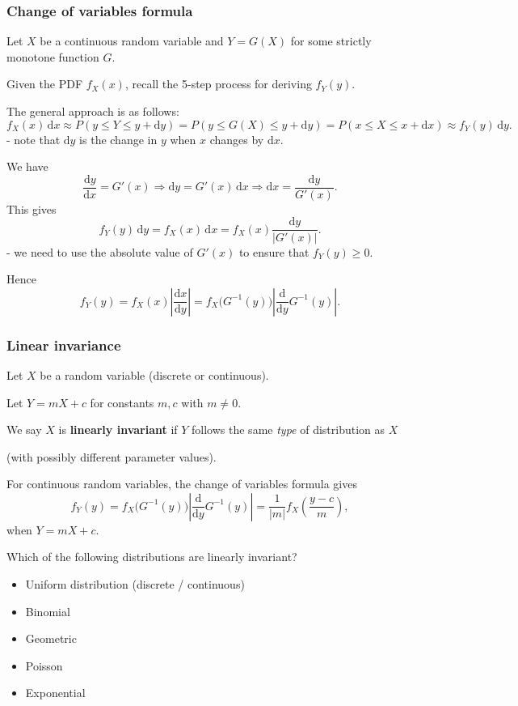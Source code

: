 \documentclass[t,8pt]{beamer}
\begin{document}
\begin{frame}
	\frametitle{Change of variables formula}
	
	Let $X$ be a continuous random variable and $Y=G(X)$ for some strictly monotone function $G$. \par
	Given the PDF $f_X(x)$, recall the 5-step process for deriving $f_Y(y)$. \par
	
	The general approach is as follows:
	\[
	f_X(x)\,\mathrm{d}x\approx P(y\leq Y\leq y+\mathrm{d}y)
	=P(y\leq G(X)\leq y+\mathrm{d}y)
	=P(x\leq X\leq x+\mathrm{d}x)
	\approx f_Y(y)\,\mathrm{d}y.
	\]
	{\small\color{NavyBlue}
		- note that $\mathrm{d}y$ is the change in $y$ when $x$ changes by $\mathrm{d}x$.
	}\par
	We have
	\[
	\frac{\mathrm{d}y}{\mathrm{d}x}=G'(x)\Rightarrow
	\mathrm{d}y=G'(x)\,\mathrm{d}x\Rightarrow
	\mathrm{d}x=\frac{\mathrm{d}y}{G'(x)}.
	\]
	This gives
	\[
	f_Y(y)\,\mathrm{d}y
	=f_X(x)\,\mathrm{d}x
	=f_X(x)\frac{\mathrm{d}y}{|G'(x)|}.
	\]
	{\small\color{NavyBlue}
		- we need to use the absolute value of $G'(x)$ to ensure that $f_Y(y)\geq 0$.
	}\par
	Hence
	\[
	f_Y(y)=f_X(x)\left|\frac{\mathrm{d}x}{\mathrm{d}y}\right|
	=f_X\big(G^{-1}(y)\big)\left|\frac{\mathrm{d}}{\mathrm{d}y}G^{-1}(y)\right|.
	\]
\end{frame}

\begin{frame}
	\frametitle{Linear invariance}
	
	Let $X$ be a random variable (discrete or continuous). \par
	Let $Y=mX+c$ for constants $m,c$ with $m\neq 0$. \par
	We say $X$ is {\bf linearly invariant} if $Y$ follows the same \emph{type} of distribution as $X$ \par
	(with possibly different parameter values). \par
	
	For continuous random variables, the change of variables formula gives
	\[
	f_Y(y)=f_X\big(G^{-1}(y)\big)\left|\frac{\mathrm{d}}{\mathrm{d}y}G^{-1}(y)\right|
	=\frac{1}{|m|}f_X\!\left(\frac{y-c}{m}\right),
	\]
	when $Y=mX+c$.
	
	Which of the following distributions are linearly invariant?
	\begin{itemize}
		\item Uniform distribution (discrete / continuous)
		\item Binomial
		\item Geometric
		\item Poisson
		\item Exponential
	\end{itemize}
\end{frame}
\end{document}
